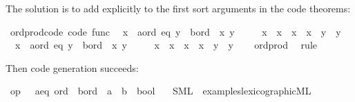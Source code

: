 \begin{isabellebody}
\begin{isamarkuptext}
  The solution is to add  explicitly to the first sort arguments in the
  code theorems:%
\end{isamarkuptext}%
\isamarkuptrue%
\isamarkupfalse%
\ ord{\isacharunderscore}prod{\isacharunderscore}code\ {\isacharbrackleft}code\ func{\isacharbrackright}{\isacharcolon}\isanewline
\ \ {\isachardoublequoteopen}{\isacharparenleft}x{}\ {\isasymColon}\ {\isacharprime}a{\isasymColon}{\isacharbraceleft}ord{\isacharcomma}\ eq{\isacharbraceright}{\isacharcomma}\ y{}\ {\isasymColon}\ {\isacharprime}b{\isasymColon}ord{\isacharparenright}\ {\isacharless}\ {\isacharparenleft}x{}{\isacharcomma}\ y{}{\isacharparenright}\ {\isasymlongleftrightarrow}\isanewline
\ \ \ \ x{}\ {\isacharless}\ x{}\ {\isasymor}\ {\isacharparenleft}x{}\ {\isacharequal}\ x{}\ {\isasymand}\ y{}\ {\isacharless}\ y{}{\isacharparenright}{\isachardoublequoteclose}\isanewline
\ \ {\isachardoublequoteopen}{\isacharparenleft}x{}\ {\isasymColon}\ {\isacharprime}a{\isasymColon}{\isacharbraceleft}ord{\isacharcomma}\ eq{\isacharbraceright}{\isacharcomma}\ y{}\ {\isasymColon}\ {\isacharprime}b{\isasymColon}ord{\isacharparenright}\ {\isasymle}\ {\isacharparenleft}x{}{\isacharcomma}\ y{}{\isacharparenright}\ {\isasymlongleftrightarrow}\isanewline
\ \ \ \ x{}\ {\isacharless}\ x{}\ {\isasymor}\ {\isacharparenleft}x{}\ {\isacharequal}\ x{}\ {\isasymand}\ y{}\ {\isasymle}\ y{}{\isacharparenright}{\isachardoublequoteclose}\isanewline
%
\isadelimproof
\ \ %
\endisadelimproof
%
\isatagproof
{}\isamarkupfalse%
\ ord{\isacharunderscore}prod\ \isamarkupfalse%
\ rule{\isacharplus}%
\endisatagproof
{\isafoldproof}%
%
\isadelimproof
%
\endisadelimproof
%
\begin{isamarkuptext}%
\noindent Then code generation succeeds:%
\end{isamarkuptext}%
\isamarkuptrue%
\isamarkupfalse%
\ {\isachardoublequoteopen}op\ {\isasymle}\ {\isasymColon}\ {\isacharprime}a{\isasymColon}{\isacharbraceleft}eq{\isacharcomma}\ ord{\isacharbraceright}\ {\isasymtimes}\ {\isacharprime}b{\isasymColon}ord\ {\isasymRightarrow}\ {\isacharprime}a\ {\isasymtimes}\ {\isacharprime}b\ {\isasymRightarrow}\ bool{\isachardoublequoteclose}\isanewline
\ \ \ SML\ \ {\isachardoublequoteopen}examples{\isacharslash}lexicographic{\isachardot}ML{\isachardoublequoteclose}%

\end{isabellebody}
